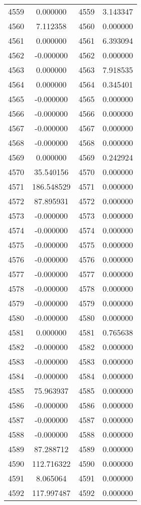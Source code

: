 \documentclass[12pt]{article}
\begin{document}
\begin{longtable}{@{}cccc@{}}
4559 & 0.000000 & 4559 & 3.143347 \\
4560 & 7.112358 & 4560 & 0.000000 \\
4561 & 0.000000 & 4561 & 6.393094 \\
4562 & -0.000000 & 4562 & 0.000000 \\
4563 & 0.000000 & 4563 & 7.918535 \\
4564 & 0.000000 & 4564 & 0.345401 \\
4565 & -0.000000 & 4565 & 0.000000 \\
4566 & -0.000000 & 4566 & 0.000000 \\
4567 & -0.000000 & 4567 & 0.000000 \\
4568 & -0.000000 & 4568 & 0.000000 \\
4569 & 0.000000 & 4569 & 0.242924 \\
4570 & 35.540156 & 4570 & 0.000000 \\
4571 & 186.548529 & 4571 & 0.000000 \\
4572 & 87.895931 & 4572 & 0.000000 \\
4573 & -0.000000 & 4573 & 0.000000 \\
4574 & -0.000000 & 4574 & 0.000000 \\
4575 & -0.000000 & 4575 & 0.000000 \\
4576 & -0.000000 & 4576 & 0.000000 \\
4577 & -0.000000 & 4577 & 0.000000 \\
4578 & -0.000000 & 4578 & 0.000000 \\
4579 & -0.000000 & 4579 & 0.000000 \\
4580 & -0.000000 & 4580 & 0.000000 \\
4581 & 0.000000 & 4581 & 0.765638 \\
4582 & -0.000000 & 4582 & 0.000000 \\
4583 & -0.000000 & 4583 & 0.000000 \\
4584 & -0.000000 & 4584 & 0.000000 \\
4585 & 75.963937 & 4585 & 0.000000 \\
4586 & -0.000000 & 4586 & 0.000000 \\
4587 & -0.000000 & 4587 & 0.000000 \\
4588 & -0.000000 & 4588 & 0.000000 \\
4589 & 87.288712 & 4589 & 0.000000 \\
4590 & 112.716322 & 4590 & 0.000000 \\
4591 & 8.065064 & 4591 & 0.000000 \\
4592 & 117.997487 & 4592 & 0.000000 \\

\end{longtable}
\end{document}
